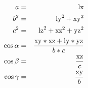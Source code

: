 \documentclass[12pt]{article}
\begin{document}
\begin{eqnarray*}
a &=& {\rm lx} \\
b^2 &=&  {\rm ly}^2 +  {\rm xy}^2 \\
c^2 &=&  {\rm lz}^2 +  {\rm xz}^2 +  {\rm yz}^2 \\
\cos{\alpha} &=& \frac{{\rm xy}*{\rm xz} + {\rm ly}*{\rm yz}}{b*c} \\
\cos{\beta} &=& \frac{\rm xz}{c} \\
\cos{\gamma} &=& \frac{\rm xy}{b} \\
\end{eqnarray*}
\end{document}

